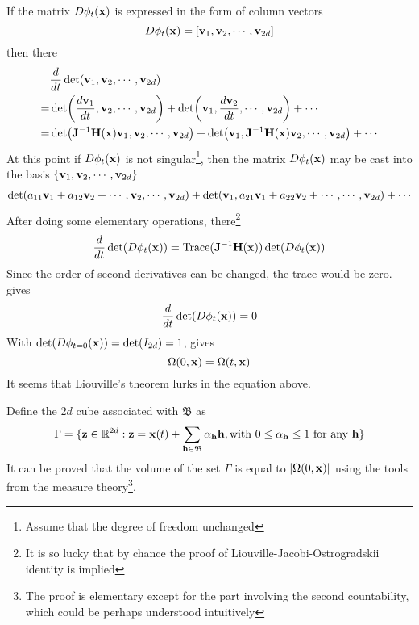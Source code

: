 If the matrix $D\phi_t(\mathbf{x})$ is expressed in the form of column vectors
\[
    D\phi_t(\mathbf{x})=[\mathbf{v}_1, \mathbf{v}_2, \cdots , \mathbf{v}_{2d}]
\]
\def\Ah{\b J^{-1}\hex}
then there
\begin{align*}
&\td\relax\det(\b v_1, \b v_2, \cdots , \b v_{2d})\\
=&\det(\td{\b v_1}, \b v_2, \cdots , \b v_{2d})+\det(\b v_1,\td{\b v_2}, \cdots , \b v_{2d})+\cdots\\
=&\det(\Ah \b v_1, \b v_2, \cdots , \b v_{2d})+\det(\b v_1,\Ah \b v_2, \cdots , \b v_{2d})+\cdots
\end{align*}
At this point if $D\phi_t(\mathbf{x})$ is not singular\footnote{Assume that the degree of freedom unchanged}, then the matrix $D\phi_t(\mathbf{x})$ may be cast into the basis $\{\mathbf{v}_1, \mathbf{v}_2, \cdots , \mathbf{v}_{2d}\}$
\begin{align*}
\det(a_{11}\mathbf{v}_1+a_{12}\mathbf{v}_2+\cdots, \mathbf{v}_2, \cdots , \mathbf{v}_{2d})+\det(\mathbf{v}_1,a_{21}\mathbf{v}_1+a_{22}\mathbf{v}_2+\cdots, \cdots , \mathbf{v}_{2d})+\cdots\\
\end{align*}
After doing some elementary operations, there\footnote{It is so lucky that by chance the proof of Liouville-Jacobi-Ostrogradskii identity is implied}
\begin{equation}\label{mu}
\td\relax\det(D\phi_t(\b x))=\trace(\Ah)\det(D\phi_t(\b x))
\end{equation}
Since the order of second derivatives can be changed, the trace would be zero.  gives
\begin{equation}\label{mucat}
\frac{d\relax}{dt}\det(D\phi_t(\mathbf{x}))=0
\end{equation}
With $\det(D\phi_{t=0}(\mathbf{x}))=\det (I_{2d})=1$,  gives
\begin{equation}\label{li1}
\Omega(0, \mathbf{x})=\Omega(t, \mathbf{x})
\end{equation}
It seems that Liouville's theorem lurks in the equation above. 

Define the $2d$ cube associated with $\mathfrak B$ as
\begin{equation}
\Gamma=\{\mathbf{z}\in \mathbb R^{2d} :\mathbf{z}=\mathbf{x}(t)+\sum_{\mathbf{h}\in \mathfrak B}\alpha_{\mathbf{h}} \mathbf{h}, \text{with }0\leq \alpha_{\mathbf{h}}\leq 1\text{ for any }\mathbf{h} \}
\end{equation}
It can be proved that the volume of the set $\Gamma$ is equal to $|\Omega(0,\mathbf{x})|$ using the tools from the measure theory\footnote{The proof is elementary except for the part involving the second countability, which could be perhaps understood intuitively}.

